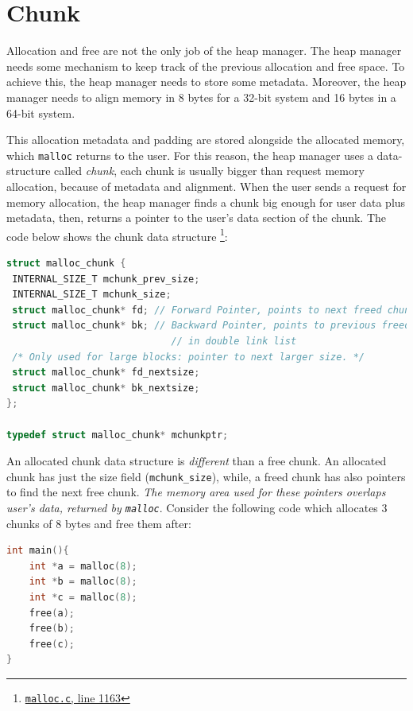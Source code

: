 \documentclass{masterthesis}
\newcommand*\mallocc{\lstinline{malloc}\xspace}
\begin{document}
\section{Chunk}

Allocation and free are not the only job of the heap manager. The heap manager needs some mechanism to keep track of the previous allocation and free space.  To achieve this, the heap manager needs to store some metadata.  Moreover, the heap manager needs to align memory in 8 bytes for a 32-bit system and 16 bytes in a 64-bit system.

This allocation metadata and padding are stored alongside the allocated memory, which \mallocc{} returns to the user. For this reason, the heap manager uses a data-structure called \emph{chunk}, each chunk is usually bigger than request memory allocation, because of metadata and alignment. When the user sends a request for memory allocation, the heap manager finds a chunk big enough for user data plus metadata, then, returns a pointer to the user's data section of the chunk. The code below shows the chunk data structure \footnote{\href{https://sourceware.org/git/?p=glibc.git;a=blob;f=malloc/malloc.c;\#l1163}{\texttt{malloc.c}, line 1163}}:

\begin{lstlisting}[language=c,frame=single]
struct malloc_chunk {
 INTERNAL_SIZE_T mchunk_prev_size;
 INTERNAL_SIZE_T mchunk_size;
 struct malloc_chunk* fd; // Forward Pointer, points to next freed chunk
 struct malloc_chunk* bk; // Backward Pointer, points to previous freed chunk
                             // in double link list
 /* Only used for large blocks: pointer to next larger size. */
 struct malloc_chunk* fd_nextsize;
 struct malloc_chunk* bk_nextsize;
};

typedef struct malloc_chunk* mchunkptr;
\end{lstlisting}

An allocated chunk data structure is \emph{different} than a free chunk. An allocated chunk has just the size field (\lstinline{mchunk_size}), while, a freed chunk has also pointers to find the next free chunk.
\emph{The memory area used for these pointers overlaps user's data, returned by \mallocc{}}.
Consider the following code which allocates 3 chunks of 8 bytes and free them after:

\begin{lstlisting}[language=c,frame=tlrb]
int main(){
	int *a = malloc(8);
	int *b = malloc(8);
	int *c = malloc(8);
	free(a);
	free(b);
	free(c);
}
\end{lstlisting}
\end{document}
